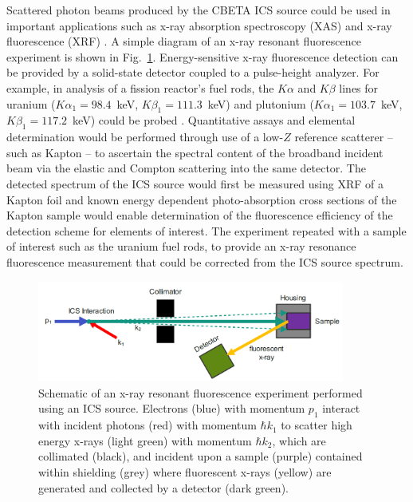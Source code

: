 \documentclass[../main.tex]{subfiles}
\begin{document}
Scattered photon beams produced by the CBETA ICS source could be used in important applications such as x-ray absorption spectroscopy (XAS) and x-ray fluorescence (XRF) \cite{willmott2019introduction}. A simple diagram of an x-ray resonant fluorescence experiment is shown in Fig.~\ref{fig:XRF_diagram}. Energy-sensitive x-ray fluorescence detection can be provided by a solid-state detector coupled to a pulse-height analyzer. For example, in analysis of a fission reactor's fuel rods, the $K\alpha$ and $K\beta$ lines for uranium ($K\alpha_{1} = 98.4$~\si{\kilo\electronvolt}, $K\beta_{1} = 111.3$~\si{\kilo\electronvolt}) and plutonium ($K\alpha_{1} = 103.7$~\si{\kilo\electronvolt}, $K\beta_{1} = 117.2$~\si{\kilo\electronvolt}) could be probed \cite{havrilla2015feasibility}. Quantitative assays and elemental determination would be performed through use of a low-$Z$ reference scatterer -- such as Kapton -- to ascertain the spectral content of the broadband incident beam via the elastic and Compton scattering into the same detector. The detected spectrum of the ICS source would first be measured using XRF of a Kapton foil and known energy dependent photo-absorption cross sections of the Kapton sample would enable determination of the fluorescence efficiency of the detection scheme for elements of interest. The experiment repeated with a sample of interest such as the uranium fuel rods, to provide an x-ray resonance fluorescence measurement that could be corrected from the ICS source spectrum. 
\begin{figure}[!h]
\centering
\includegraphics[width=0.9\textwidth]{Figures/CBETA_Inverse_Compton_Source_Design/XRF_diagram_fixed.pdf}
\caption{Schematic of an x-ray resonant fluorescence experiment performed using an ICS source. Electrons (blue) with momentum $p_{1}$ interact with incident photons (red) with momentum $\hbar k_{1}$ to scatter high energy x-rays (light green) with momentum $\hbar k_{2}$, which are collimated (black), and incident upon a sample (purple) contained within shielding (grey) where fluorescent x-rays (yellow) are generated and collected by a detector (dark green).}
\label{fig:XRF_diagram}
\end{figure}
\end{document}
